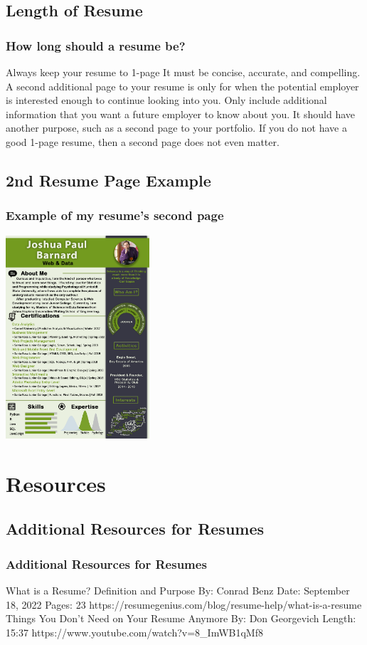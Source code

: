 \documentclass{beamer}
\begin{document}
\subsection{Length of Resume}
	\begin{frame}
	\frametitle{How long should a resume be?}
	\begin{outline}
		\1 Always keep your resume to 1-page
		\1 It must be concise, accurate, and compelling.
		\1 A second additional page to your resume is only for when the potential employer is interested enough to continue looking into you.
		\2 Only include additional information that you want a future employer to know about you.
		\2 It should have another purpose, such as a second page to your portfolio.
		\2 If you do not have a good 1-page resume, then a second page does not even matter.
	\end{outline}
\end{frame}

\subsection{2nd Resume Page Example}		
	\begin{frame}
		\frametitle{Example of my resume's second page}
		\vspace{-5pt}
		\begin{center}
			\includegraphics[width=0.4\textwidth]{images/Joshua_Paul_Barnard-second_page.png}
		\end{center}
	\end{frame}


\section{Resources}
\subsection{Additional Resources for Resumes}		
	\begin{frame}
		\frametitle{Additional Resources for Resumes}
		\begin{outline}
			\1 What is a Resume? Definition and Purpose
			\2  By:    Conrad Benz 
			\2  Date:  September 18, 2022
			\2  Pages: 23
			\2 https://resumegenius.com/blog/resume-help/what-is-a-resume
			 Things You Don't Need on Your Resume Anymore
			\2  By:      Don Georgevich
			\2  Length:  15:37
			\2 https://www.youtube.com/watch?v=8\_ImWB1qMf8
		\end{outline}
	\end{frame}

	
\end{document}
